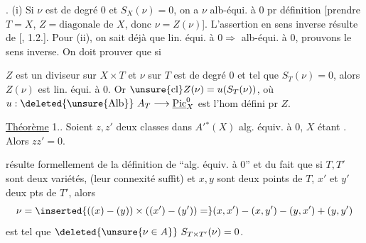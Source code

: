 
. (i) Si \(\nu\) est de degré 0 et \(S_X(\nu)=0\), on a \(\nu\) alb-équi. à 0 pr définition [prendre \(T=X\), \(Z=\text{diagonale de }X\), donc \(\nu=Z(\nu)\)]. L'assertion en sens inverse résulte de [\hspace{1em}, 1.2.]. Pour (ii), on sait déjà que lin. équi. à \(0\Rightarrow\) alb-équi. à 0, prouvons le sens inverse. On doit prouver que si


\(Z\) est un diviseur sur \(X\times T\) et \(\nu\) sur \(T\) est de degré 0 et tel que \(S_T(\nu)=0\), alors \(Z(\nu)\) est lin. équi. à 0. Or \(\unsure{\operatorname{cl}}Z(\nu)=u(S_T(\nu))\), où \(u:\deleted{\unsure{\operatorname{Alb}}}\ A_T\longrightarrow\underline{\operatorname{Pic}}_X^0\) est l'hom défini pr \(Z\).

\uline{Théorème} 1.. Soient \(z,z'\) deux classes dans \(A'{}^*(X)\) alg. équiv. à 0, \(X\) étant \deleted{[projective]}. Alors \(zz'=0\). 

  résulte formellement de la définition de ``alg. équiv. à 0''  et du fait que si \(T,T'\) sont deux  variétés,  (leur connexité suffit) et \(x,y\) sont deux points de \(T\), \(x'\) et \(y'\) deux pts de \(T'\), alors
\[
\nu=\inserted{((x)-(y))\times((x')-(y'))=}(x,x')-(x,y')-(y,x')+(y,y')
\]
est tel que \(\deleted{\unsure{\nu\in A}}\ S_{T\times T'}(\nu)=0\).

